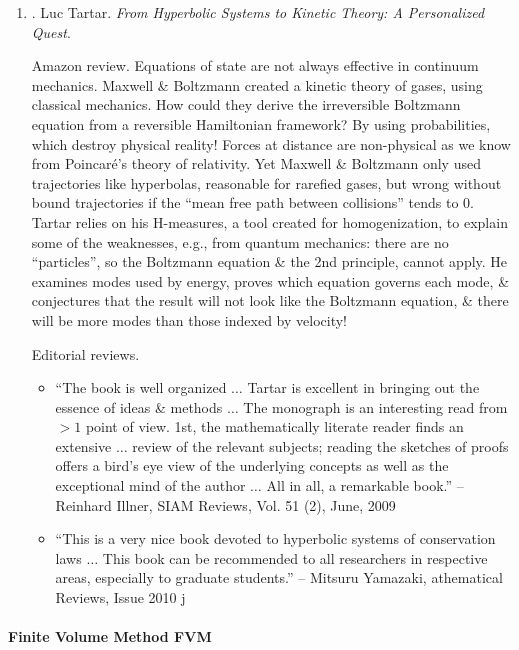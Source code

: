 \documentclass{article}
\begin{document}
\begin{enumerate}
	\item \cite{Tartar2008}. {\sc Luc Tartar}. {\it From Hyperbolic Systems to Kinetic Theory: A Personalized Quest}.
	
	{\sf Amazon review.} Equations of state are not always effective in continuum mechanics. {\sc Maxwell \& Boltzmann} created a kinetic theory of gases, using classical mechanics. How could they derive the irreversible Boltzmann equation from a reversible Hamiltonian framework? By using probabilities, which destroy physical reality! Forces at distance are non-physical as we know from {\sc Poincar\'e}'s theory of relativity. Yet {\sc Maxwell \& Boltzmann} only used trajectories like hyperbolas, reasonable for rarefied gases, but wrong without bound trajectories if the ``mean free path between collisions'' tends to 0. {\sc Tartar} relies on his H-measures, a tool created for homogenization, to explain some of the weaknesses, e.g., from quantum mechanics: there are no ``particles'', so the Boltzmann equation \& the 2nd principle, cannot apply. He examines modes used by energy, proves which equation governs each mode, \& conjectures that the result will not look like the Boltzmann equation, \& there will be more modes than those indexed by velocity!
	
	{\sf Editorial reviews.}
	\begin{itemize}
		\item ``The book is well organized $\ldots$ {\sc Tartar} is excellent in bringing out the essence of ideas \& methods $\ldots$ The monograph is an interesting read from $> 1$ point of view. 1st, the mathematically literate reader finds an extensive $\ldots$ review of the relevant subjects; reading the sketches of proofs offers a bird's eye view of the underlying concepts as well as the exceptional mind of the author $\ldots$ All in all, a remarkable book.'' -- {\sc Reinhard Illner}, SIAM Reviews, Vol. 51 (2), June, 2009
		\item ``This is a very nice book devoted to hyperbolic systems of conservation laws $\ldots$ This book can be recommended to all researchers in respective areas, especially to graduate students.'' -- {\sc Mitsuru Yamazaki}, athematical Reviews, Issue 2010 j
	\end{itemize}
\end{enumerate}

\paragraph{Finite Volume Method FVM}
\end{document}
